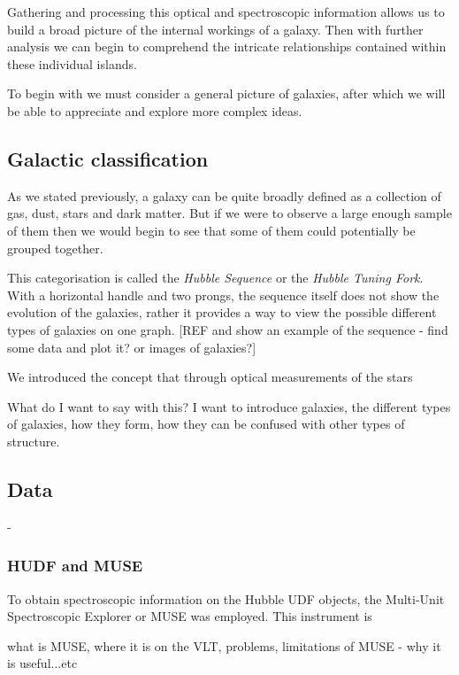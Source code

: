 \documentclass[12pt, twocolumn]{revtex4}    %
\begin{document}
Gathering and processing this optical and spectroscopic information allows us to build a broad picture of the internal workings of a galaxy. Then with further analysis we can begin to comprehend the intricate relationships contained within these individual islands. 

To begin with we must consider a general picture of galaxies, after which we will be able to appreciate and explore more complex ideas.

\subsection{Galactic classification}

As we stated previously, a galaxy can be quite broadly defined as a collection of gas, dust, stars and dark matter. But if we were to observe a large enough sample of them then we would begin to see that some of them could potentially be grouped together. 

This categorisation is called the \textit{Hubble Sequence} or the \textit{Hubble Tuning Fork}. With a horizontal handle and two prongs, the sequence itself does not show the evolution of the galaxies, rather it provides a way to view the possible different types of galaxies on one graph. [REF and show an example of the sequence - find some data and plot it? or images of galaxies?] 

We introduced the concept that through optical measurements of the stars 

What do I want to say with this? I want to introduce galaxies, the different types of galaxies, how they form, how they can be confused with other types of structure. 

\subsection{Data} 

-

\subsubsection{HUDF and MUSE}

To obtain spectroscopic information on the Hubble UDF objects, the Multi-Unit Spectroscopic Explorer or MUSE was employed. This instrument is 

what is MUSE, where it is on the VLT, problems, limitations of MUSE - why it is useful...etc

\onecolumngrid
\end{document}
